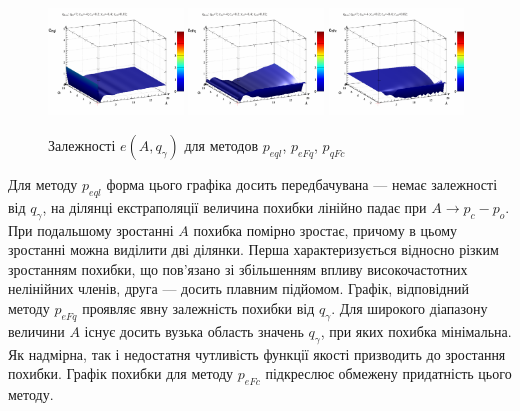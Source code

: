 \documentclass[a4paper,13pt]{atuaref}
\begin{document}
\begin{figure}[htb!]
  \centerline{
    \includegraphics[width=0.32\textwidth]{p3/p/qls_pe-p_A_qg_eql_all.png}
    \hfill
    \includegraphics[width=0.32\textwidth]{p3/p/qls_pe-p_A_qg_eFq_all.png}
    \hfill
    \includegraphics[width=0.32\textwidth]{p3/p/qls_pe-p_A_qg_eFc_all.png}
  }
  \caption{Залежності $e(A,q_\gamma)$ для методов $p_{eql}$, $p_{eFq}$, $p_{qFc}$}
  \label{atu:f:qsl_pe_A_qg_all}
\end{figure}

Для методу $ p_{eql} $ форма цього графіка досить передбачувана --- немає
залежності від $ q_\gamma $, на ділянці екстраполяції величина похибки
лінійно падає при $ A \to p_c - p_o $. При подальшому зростанні $ A $ похибка
помірно зростає, причому в цьому зростанні можна виділити дві ділянки. Перша
характеризується відносно різким зростанням похибки, що пов'язано зі збільшенням
впливу високочастотних нелінійних членів, друга --- досить плавним підйомом.
Графік, відповідний методу $ p_{eFq} $ проявляє явну залежність похибки від
$q_\gamma$. Для широкого діапазону величини $ A $ існує досить вузька область
значень $ q_\gamma $, при яких похибка мінімальна. Як надмірна, так і
недостатня чутливість функції якості призводить до зростання похибки.
Графік похибки для методу $ p_{eFc} $ підкреслює обмежену придатність цього методу.
\end{document}
